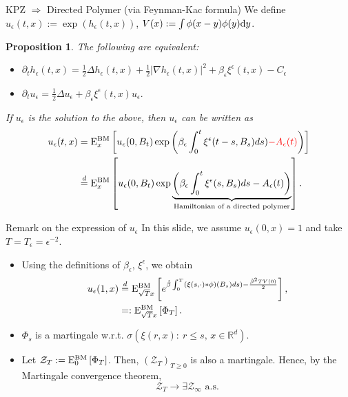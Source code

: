 \documentclass[10pt]{beamer}
\newtheorem{prop}[thm]{Proposition}
\newcommand{\R}{\mathbb{R}}
\newcommand{\e}{\epsilon}
\def\al#1{\begin{align*}#1\end{align*}}
\begin{document}
\begin{frame}{{\rm KPZ} $\Rightarrow$ Directed Polymer (via Feynman-Kac formula)}
 We define $u_{\epsilon}(t,x):=\exp{(h_{\epsilon}(t,x))}$, $V(x):= \int \phi(x-y)\phi(y) {\rm d} y$.
  \begin{prop}
      The following are equivalent:
     \begin{itemize}
         \item $\partial_t h_{\e}(t,x)=\frac{1}{2}\Delta h_{\e}(t,x)+\frac{1}{2}\left|\nabla h_{\e}(t,x)\right|^2+\beta_{\e} \xi^{\e}(t,x)-C_{\e}$ \item $\partial_t u_{\epsilon}=\frac{1}{2}\Delta u_{\epsilon} +\beta_{\epsilon} \xi^{\e} (t,x)u_{\epsilon}.$
     \end{itemize}  
     \pause
    If $u_\e$ is the solution to the above, then $u_{\epsilon}$ can be written as
    \vspace{-1mm}
    \al{
    u_{\epsilon}(t,x)&= {\rm E}_{x}^{\rm BM}\left[u_{\epsilon}(0,B_t)\exp{\left(\beta_{\epsilon}\int_{0}^t \xi^{\e}  (t-s,B_s)ds){\color{red}-A_{\epsilon}(t)}\right)}\right]\\
       &\overset{d}{=}{\rm E}_{x}^{\rm BM}\left[u_{\epsilon}(0,B_t) \exp{\underbrace{\left(\beta_{\epsilon}\int_{0}^t \xi^{\e} (s,B_s)ds-A_{\epsilon}(t)\right)}_{\text{Hamiltonian of a directed polymer}}}\right].
    }
  \end{prop}
\end{frame}
\begin{frame}{Remark on the expression of $u_{\epsilon}$}
  In this slide, we assume $u_{\epsilon}(0,x)=1$ and take $T=T_{\epsilon}=\e^{-2}$.
  \begin{itemize}
    \item Using the definitions of $\beta_{\epsilon}$, $\xi^{\e} $, we obtain
  \al{
    u_{\epsilon}(1,x)&\overset{d}{=}{\rm E}_{\sqrt{T} x}^{\rm BM}\left[e^{\hat{\beta} \int_{0}^{T} (\xi(s,\cdot)* \phi)(B_s)ds)-\frac{\hat{\beta}^2  T V(0)}{2}}\right],\\
    &=: {\rm E}_{\sqrt{T} x}^{\rm BM}\left[\Phi_{T}\right].
  }
\item  $\Phi_{s}$ is a martingale w.r.t. $\sigma(\xi(r,x):~r\leq s,\,x\in\R^d)$.
\item Let $\mathcal{Z}_T:={\rm E}_{0}^{\rm BM}\left[\Phi_T\right]$. Then, $(\mathcal{Z}_T)_{T\geq 0}$ is also a martingale. Hence, by the Martingale convergence theorem,
  $$\mathcal{Z}_T\to \exists \mathcal{Z}_\infty\text{ a.s.}$$
  \end{itemize}
  \end{frame}
\end{document}
